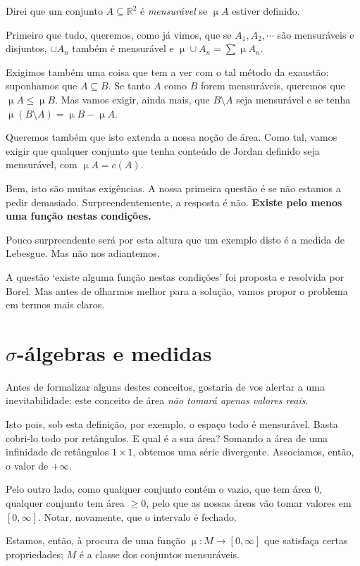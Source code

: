 \documentclass{article}
\newcommand{\R}{\mathbb{R}}
\DeclareMathOperator{\mmu}{\mu}
\begin{document}
Direi que um conjunto $A \subseteq \R^2$ é \emph{mensurável} se $\mmu A$ estiver definido.

Primeiro que tudo, queremos, como já vimos, que se $A_1, A_2, \cdots$ são mensuráveis e disjuntos, $\cup A_n$ também é mensurável e $\mmu \cup A_n = \sum \mmu A_n$.

Exigimos também uma coisa que tem a ver com o tal método da exaustão: suponhamos que $A \subseteq B$. Se tanto $A$ como $B$ forem mensuráveis, queremos que $\mmu A \leq \mmu B$. Mas vamos exigir, ainda mais, que $B \setminus A$ seja mensurável e se tenha $\mmu (B \setminus A) = \mmu B - \mmu A$.

Queremos também que isto extenda a nossa noção de área. Como tal, vamos exigir que qualquer conjunto que tenha conteúdo de Jordan definido seja mensurável, com $\mmu A = c(A)$.

Bem, isto são muitas exigências. A nossa primeira questão é se não estamos a pedir demasiado. Surpreendentemente, a resposta é não. \textbf{Existe pelo menos uma função nestas condições.}

Pouco surpreendente será por esta altura que um exemplo disto é a medida de Lebesgue. Mas não nos adiantemos.

A questão `existe alguma função nestas condições' foi proposta e resolvida por Borel. Mas antes de olharmos melhor para a solução, vamos propor o problema em termos mais claros.

\section{$\sigma$-álgebras e medidas}

Antes de formalizar alguns destes conceitos, gostaria de vos alertar a uma inevitabilidade: este conceito de área \emph{não tomará apenas valores reais}.

Isto pois, sob esta definição, por exemplo, o espaço todo é mensurável. Basta cobri-lo todo por retângulos. E qual é a sua área? Somando a área de uma infinidade de retângulos $1 \times 1$, obtemos uma série divergente. Associamos, então, o valor de $+ \infty$.

Pelo outro lado, como qualquer conjunto contém o vazio, que tem área 0, qualquer conjunto tem área $\geq 0$, pelo que as nossas áreas vão tomar valores em $[0, \infty]$. Notar, novamente, que o intervalo é fechado.

Estamos, então, à procura de uma função $\mmu : M \to [0, \infty]$ que satisfaça certas propriedades; $M$ é a classe dos conjuntos mensuráveis.
\end{document}
